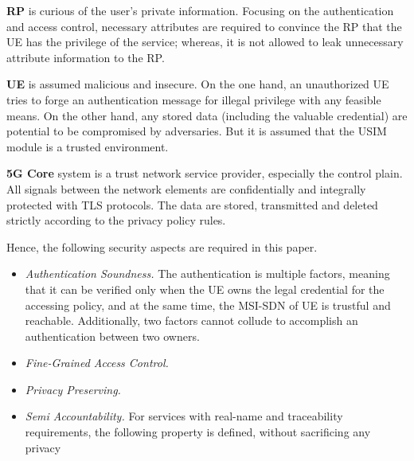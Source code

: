 \textbf{RP} is curious of the user's private information. Focusing on the authentication and access control, necessary attributes are required to convince the RP that the UE has the privilege of the service; whereas, it is not allowed to leak unnecessary attribute information to the RP. 

\textbf{UE} is assumed malicious and insecure. On the one hand, an unauthorized UE tries to forge an authentication message for illegal privilege with any feasible means. On the other hand, any stored data (including the valuable credential) are potential to be compromised by adversaries. But it is assumed that the USIM module is a trusted environment. 

\textbf{5G Core} system is a trust network service provider, especially the control plain. All signals between the network elements are confidentially and integrally protected with TLS protocols. The data are stored, transmitted and deleted strictly according to the privacy policy rules.

Hence, the following security aspects are required in this paper.

\begin{itemize}
	\item \textit{Authentication Soundness.} 
	The authentication is multiple factors, meaning that it can be verified only when the UE owns the legal credential for the accessing policy, and at the same time, the MSI-SDN of UE is trustful and reachable. Additionally, two factors cannot collude to accomplish an authentication between two owners.
	\item \textit{Fine-Grained Access Control.} 
	\item \textit{Privacy Preserving.} 
	\item \textit{Semi Accountability.} For services with real-name and traceability requirements, the following property is defined, without sacrificing any privacy 
\end{itemize}


